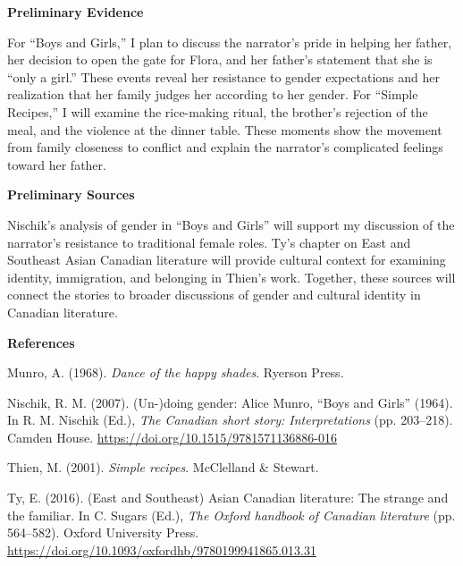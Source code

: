 \documentclass[12pt]{article}
\begin{document}
\textbf{Preliminary Evidence}

For ``Boys and Girls,'' I plan to discuss the narrator's pride in helping her father, her decision to open the gate for Flora, and her father's statement that she is ``only a girl.'' These events reveal her resistance to gender expectations and her realization that her family judges her according to her gender. For ``Simple Recipes,'' I will examine the rice-making ritual, the brother's rejection of the meal, and the violence at the dinner table. These moments show the movement from family closeness to conflict and explain the narrator's complicated feelings toward her father.

\textbf{Preliminary Sources}

Nischik's analysis of gender in ``Boys and Girls'' will support my discussion of the narrator's resistance to traditional female roles. Ty's chapter on East and Southeast Asian Canadian literature will provide cultural context for examining identity, immigration, and belonging in Thien's work. Together, these sources will connect the stories to broader discussions of gender and cultural identity in Canadian literature.

\clearpage
\begin{center}
\textbf{References}
\end{center}
\raggedright

\hangindent=0.5in\noindent Munro, A. (1968). \textit{Dance of the happy shades}. Ryerson Press.

\hangindent=0.5in\noindent Nischik, R. M. (2007). (Un-)doing gender: Alice Munro, ``Boys and Girls'' (1964). In R. M. Nischik (Ed.), \textit{The Canadian short story: Interpretations} (pp. 203--218). Camden House. \url{https://doi.org/10.1515/9781571136886-016}

\hangindent=0.5in\noindent Thien, M. (2001). \textit{Simple recipes}. McClelland \& Stewart.

\hangindent=0.5in\noindent Ty, E. (2016). (East and Southeast) Asian Canadian literature: The strange and the familiar. In C. Sugars (Ed.), \textit{The Oxford handbook of Canadian literature} (pp. 564--582). Oxford University Press. \url{https://doi.org/10.1093/oxfordhb/9780199941865.013.31}
\end{document}
